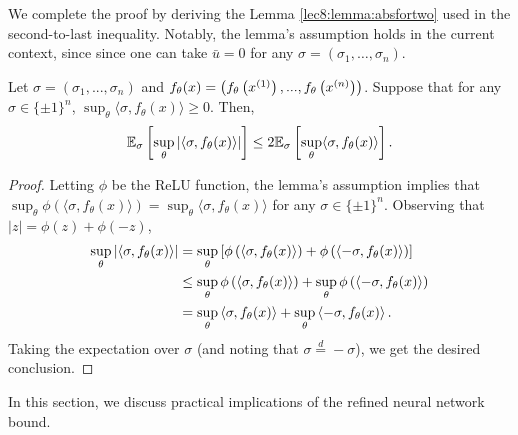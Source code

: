 We complete the proof by deriving the Lemma \ref{lec8:lemma:absfortwo} used in the second-to-last inequality. Notably, the lemma's assumption holds in the current context, since
since one can take $\bar{u} = 0$ for any $\sigma = (\sigma_1, \dots, \sigma_n)$.

\begin{lemma}\label{lec8:lemma:absfortwo}
Let $\sigma = (\sigma_1, ..., \sigma_n)$ and $f_{\theta}(x) = \left(f_{\theta}\left(x^{(1)}\right), ...,  f_{\theta}\left(x^{(n)} \right)\right)$. Suppose that for any $\sigma \in \{\pm 1\}^n$, $\sup_{\theta} \langle \sigma, f_{\theta}(x) \rangle \geq 0$. Then, 
\begin{equation}
\mathbb{E}_{\sigma}\left[ \sup_{\theta}  \left | \langle \sigma, f_{\theta}(x) \rangle \right|  \right] \leq 2 \mathbb{E}_{\sigma}\left[ \sup_{\theta}  \langle \sigma, f_{\theta}(x) \rangle   \right].
\end{equation}
\end{lemma}

\begin{proof}
Letting $\phi$ be the ReLU function, the lemma's assumption implies that $\sup_{\theta} \phi\left(\langle \sigma, f_{\theta}(x) \rangle\right) = \sup_{\theta}\langle \sigma, f_{\theta}(x) \rangle$ for any $\sigma \in \{\pm 1\}^n$. Observing that $|z| = \phi(z) + \phi(-z)$, 
\begin{align}
\sup_{\theta} \abs{\inprod{ \sigma, f_{\theta}(x) }}%
&= \sup_{\theta} \left[ \phi \l(\inprod{ \sigma, f_{\theta}(x) } \r) + \phi \l(\inprod{-\sigma, f_{\theta}(x) } \r)\right] \\
&\le \sup_{\theta}  \phi \l(\inprod{ \sigma, f_{\theta}(x) } \r) +  \sup_{\theta}  \phi \l(\inprod{-\sigma, f_{\theta}(x) } \r)  \\
&= \sup_{\theta} \inprod{ \sigma, f_{\theta}(x) } +  \sup_{\theta}  \inprod{-\sigma, f_{\theta}(x) }. 
\end{align}
Taking the expectation over $\sigma$ (and noting that $\sigma \overset d = -\sigma$), we get the desired conclusion.
\end{proof}



In this section, we discuss practical implications of the refined neural network bound. 

\label{sec:gen-bounds:impliciation}

